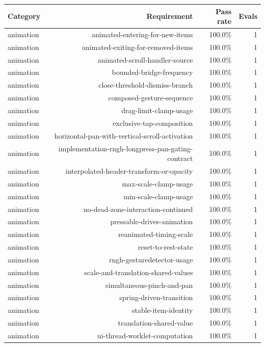 \begin{table}[htbp]
\centering
\begin{tabular}{lrrr}
\toprule
Category & Requirement & Pass rate & Evals \\
\midrule
animation & animated-entering-for-new-items & 100.0\% & 1 \\
animation & animated-exiting-for-removed-items & 100.0\% & 1 \\
animation & animated-scroll-handler-source & 100.0\% & 1 \\
animation & bounded-bridge-frequency & 100.0\% & 1 \\
animation & close-threshold-dismiss-branch & 100.0\% & 1 \\
animation & composed-gesture-sequence & 100.0\% & 1 \\
animation & drag-limit-clamp-usage & 100.0\% & 1 \\
animation & exclusive-tap-composition & 100.0\% & 1 \\
animation & horizontal-pan-with-vertical-scroll-activation & 100.0\% & 1 \\
animation & implementation-rngh-longpress-pan-gating-contract & 100.0\% & 1 \\
animation & interpolated-header-transform-or-opacity & 100.0\% & 1 \\
animation & max-scale-clamp-usage & 100.0\% & 1 \\
animation & min-scale-clamp-usage & 100.0\% & 1 \\
animation & no-dead-zone-interaction-continued & 100.0\% & 1 \\
animation & pressable-drives-animation & 100.0\% & 1 \\
animation & reanimated-timing-scale & 100.0\% & 1 \\
animation & reset-to-rest-state & 100.0\% & 1 \\
animation & rngh-gesturedetector-usage & 100.0\% & 1 \\
animation & scale-and-translation-shared-values & 100.0\% & 1 \\
animation & simultaneous-pinch-and-pan & 100.0\% & 1 \\
animation & spring-driven-transition & 100.0\% & 1 \\
animation & stable-item-identity & 100.0\% & 1 \\
animation & translation-shared-value & 100.0\% & 1 \\
animation & ui-thread-worklet-computation & 100.0\% & 1 \\

\end{tabular}
\end{table}
